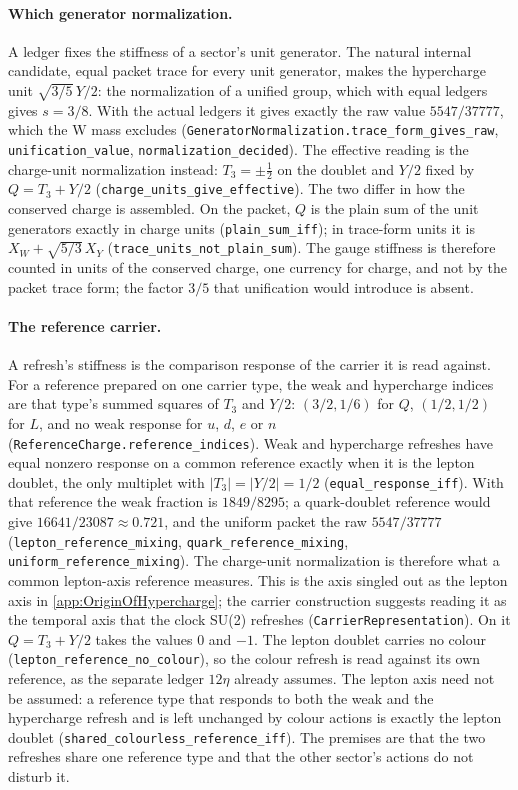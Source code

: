 \paragraph{Which generator normalization.} A ledger fixes the stiffness of a sector's unit generator. The natural internal candidate, equal packet trace for every unit generator, makes the hypercharge unit $\sqrt{3/5}\,Y/2$: the normalization of a unified group, which with equal ledgers gives $s=3/8$. With the actual ledgers it gives exactly the raw value $5547/37777$, which the W mass excludes (\texttt{GeneratorNormalization.trace\_form\_gives\_raw}, \texttt{unification\_value}, \texttt{normalization\_decided}). The effective reading is the charge-unit normalization instead: $T_3=\pm\tfrac12$ on the doublet and $Y/2$ fixed by $Q=T_3+Y/2$ (\texttt{charge\_units\_give\_effective}). The two differ in how the conserved charge is assembled. On the packet, $Q$ is the plain sum of the unit generators exactly in charge units (\texttt{plain\_sum\_iff}); in trace-form units it is $X_W+\sqrt{5/3}\,X_Y$ (\texttt{trace\_units\_not\_plain\_sum}). The gauge stiffness is therefore counted in units of the conserved charge, one currency for charge, and not by the packet trace form; the factor $3/5$ that unification would introduce is absent.

\paragraph{The reference carrier.} A refresh's stiffness is the comparison response of the carrier it is read against. For a reference prepared on one carrier type, the weak and hypercharge indices are that type's summed squares of $T_3$ and $Y/2$: $(3/2,1/6)$ for $Q$, $(1/2,1/2)$ for $L$, and no weak response for $u$, $d$, $e$ or $n$ (\texttt{ReferenceCharge.reference\_indices}). Weak and hypercharge refreshes have equal nonzero response on a common reference exactly when it is the lepton doublet, the only multiplet with $|T_3|=|Y/2|=1/2$ (\texttt{equal\_response\_iff}). With that reference the weak fraction is $1849/8295$; a quark-doublet reference would give $16641/23087\approx0.721$, and the uniform packet the raw $5547/37777$ (\texttt{lepton\_reference\_mixing}, \texttt{quark\_reference\_mixing}, \texttt{uniform\_reference\_mixing}). The charge-unit normalization is therefore what a common lepton-axis reference measures. This is the axis singled out as the lepton axis in \cref{app:OriginOfHypercharge}; the carrier construction suggests reading it as the temporal axis that the clock SU(2) refreshes (\texttt{CarrierRepresentation}). On it $Q=T_3+Y/2$ takes the values $0$ and $-1$. The lepton doublet carries no colour (\texttt{lepton\_reference\_no\_colour}), so the colour refresh is read against its own reference, as the separate ledger $12\eta$ already assumes. The lepton axis need not be assumed: a reference type that responds to both the weak and the hypercharge refresh and is left unchanged by colour actions is exactly the lepton doublet (\texttt{shared\_colourless\_reference\_iff}). The premises are that the two refreshes share one reference type and that the other sector's actions do not disturb it.

